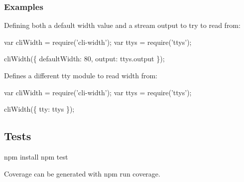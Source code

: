 \subsubsection*{Examples}

Defining both a default width value and a stream output to try to read from\+:


\begin{DoxyCode}
var cliWidth = require('cli-width');
var ttys = require('ttys');

cliWidth(\{
  defaultWidth: 80,
  output: ttys.output
\});
\end{DoxyCode}


Defines a different tty module to read width from\+:


\begin{DoxyCode}
var cliWidth = require('cli-width');
var ttys = require('ttys');

cliWidth(\{
  tty: ttys
\});
\end{DoxyCode}


\subsection*{Tests}


\begin{DoxyCode}
npm install
npm test
\end{DoxyCode}


Coverage can be generated with {\ttfamily npm run coverage}. 
